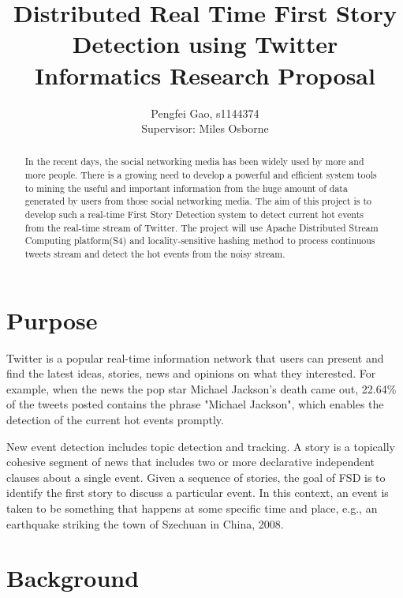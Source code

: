 \documentclass[a4paper,12pt]{article}
\title{Distributed Real Time First Story Detection using Twitter \\ Informatics Research Proposal}
\author{Pengfei Gao, s1144374 \\ Supervisor: Miles Osborne}
\begin{document}
\maketitle

\begin{abstract}

In the recent days, the social networking media has been widely used by more and more people. There is a growing need to develop a powerful and efficient system tools to mining the useful and important information from the huge amount of data generated by users from those social networking media. The aim of this project is to develop such a real-time First Story Detection system to detect current hot events from the real-time stream of Twitter. The project will use Apache Distributed Stream Computing platform(S4) and locality-sensitive hashing method to process continuous tweets stream and detect the hot events from the noisy stream.

\end{abstract}



\section{Purpose}


Twitter is a popular real-time information network that users can present and find the latest ideas, stories, news and opinions on what they interested. For example, when the news the pop star Michael Jackson's death came out, 22.64\% of the tweets posted contains the phrase "Michael Jackson", which enables the detection of the current hot events promptly.\newline

New event detection includes topic detection and tracking. A story is a topically cohesive segment of news that includes two or more declarative independent clauses about a single event. Given a sequence of stories, the goal of FSD is to identify the first story to discuss a particular event. In this context, an event is taken to be something that happens at some specific time and place, e.g., an earthquake striking the town of Szechuan in China, 2008.







\section{Background}
\end{document}
